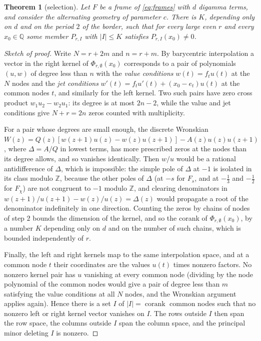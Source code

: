 \documentclass[11pt]{amsart}
\newtheorem{theorem}{Theorem}[section]
\theoremstyle{definition}
\theoremstyle{remark}
\numberwithin{equation}{section}
\newcommand{\Z}{\mathbb Z}
\newcommand{\Q}{\mathbb Q}
\newcommand{\corank}{\operatorname{corank}}
\begin{document}
\begin{theorem}[selection]\label{thm:selection}
Let $F$ be a frame of \eqref{eq:frames} with $d$ digamma terms, and consider the alternating geometry of parameter $c$. There is
$K$, depending only on $d$ and on the period $2$ of the border, such that for every large even $r$ and every $x_0\in\Q$ some
member $P_{r,I}$ with $|I|\le K$ satisfies $P_{r,I}(x_0)\ne0$.
\end{theorem}

\begin{proof}[Sketch of proof]
Write $N=r+2m$ and $n=r+m$. By barycentric interpolation a vector in the right kernel of $\Phi_{r,\emptyset}(x_0)$ corresponds to a
pair of polynomials $(u,w)$ of degree less than $n$ with the \emph{value conditions} $w(t)=f_tu(t)$ at the $N$ nodes and the
\emph{jet conditions} $w'(t)=f_tu'(t)+(x_0-e_t)u(t)$ at the common nodes $t$, and similarly for the left kernel. Two such pairs
have zero cross product $w_1u_2-w_2u_1$: its degree is at most $2n-2$, while the value and jet conditions give $N+r=2n$ zeros
counted with multiplicity.

For a pair whose degrees are small enough, the discrete Wronskian
$W(z)=Q(z)[w(z+1)u(z)-w(z)u(z+1)]-A(z)u(z)u(z+1)$, where $\Delta=A/Q$ in lowest terms, has more prescribed zeros at the
nodes than its degree allows, and so vanishes identically. Then $w/u$ would be a rational antidifference of $\Delta$, which
is impossible: the simple pole of $\Delta$ at $-1$ is isolated in its class modulo $\Z$, because the other poles of $\Delta$
(at $-s$ for $F_s$, and at $-\frac13$ and $-\frac12$ for $F_\chi$) are not congruent to $-1$ modulo $\Z$, and clearing
denominators in $w(z+1)/u(z+1)-w(z)/u(z)=\Delta(z)$ would propagate a root of
the denominator indefinitely in one direction. Counting the zeros by chains of nodes of step $2$ bounds the dimension of
the kernel, and so the corank of $\Phi_{r,\emptyset}(x_0)$, by a number $K$ depending only on $d$ and on the number of such
chains, which is bounded independently of $r$.

Finally, the left and right kernels map to the same interpolation space, and at a common node $t$ their coordinates are the
values $u(t)$ times nonzero factors. No nonzero kernel pair has $u$ vanishing at every common node (dividing by the node
polynomial of the common nodes would give a pair of degree less than $m$ satisfying the value conditions at all $N$ nodes,
and the Wronskian argument applies again). Hence there is a set $I$ of $|I|=\corank$ common nodes such that no nonzero left
or right kernel vector vanishes on $I$. The rows outside $I$ then span the row space, the columns outside $I$ span the
column space, and the principal minor deleting $I$ is nonzero.
\end{proof}
\end{document}
